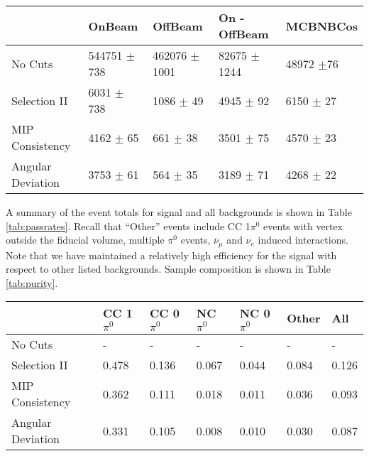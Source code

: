\documentclass{article}
\begin{document}
\begin{table*} 
 \centering
 \begin{tabular}{| l | l | l | l | l |}
  \hline
   & OnBeam & OffBeam & On - OffBeam & MCBNBCos \\ [0.1ex] \hline
No Cuts & 544751 $\pm$ 738 & 462076 $\pm$ 1001 & 82675 $\pm$ 1244 & 48972 $\pm$76 \\ 
Selection II & 6031 $\pm$ 738 & 1086 $\pm$ 49 & 4945 $\pm$ 92 & 6150 $\pm$ 27  \\ \hline
MIP Consistency & 4162 $\pm$ 65 & 661 $\pm$ 38 & 3501 $\pm$ 75 & 4570 $\pm$ 23  \\ 
Angular Deviation & 3753 $\pm$ 61 & 564 $\pm$ 35 & 3189 $\pm$ 71 & 4268 $\pm$ 22  \\ \hline

\end{tabular}
 \end{table*}

\par A summary of the event totals for signal and all backgrounds is shown in Table \ref{tab:passrates}.  Recall that ``Other'' events include CC 1$\pi^0$ events with vertex outside the fiducial volume, multiple $\pi^0$ events, $\overline{\nu}_\mu$ and $\nu_e$ induced interactions.  Note that we have maintained a relatively high efficiency for the signal with respect to other listed backgrounds. Sample composition is shown in Table \ref{tab:purity}. 

\begin{table*}
\centering
{}
 \begin{tabular}{| l | l | l |l|l|l|l|}
 \hline
 & CC 1$\pi^0$ & CC 0$\pi^0$ & NC $\pi^0$ & NC 0$\pi^0$ & Other & All \\ [0.1ex] \hline
No Cuts & - & - & - & - & - & -\\
Selection II & 0.478 & 0.136 & 0.067 & 0.044 & 0.084 & 0.126 \\ \hline
MIP Consistency & 0.362 & 0.111 & 0.018 & 0.011 & 0.036 & 0.093 \\ 
Angular Deviation & 0.331 & 0.105 & 0.008 & 0.010 & 0.030 & 0.087 \\ \hline
\end{tabular}
\end{table*}
\end{document}

